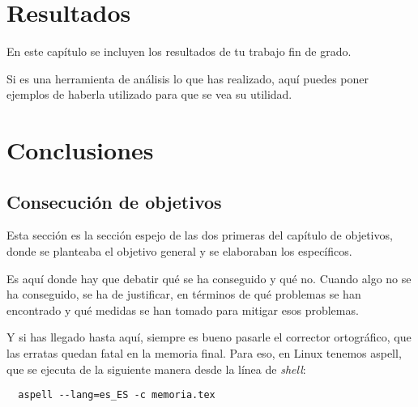 \documentclass[a4paper, 12pt]{book}
\begin{document}

\cleardoublepage
\chapter{Resultados}
\label{chap:resultados}

En este capítulo se incluyen los resultados de tu trabajo fin de grado.

Si es una herramienta de análisis lo que has realizado, aquí puedes poner ejemplos de haberla utilizado para que se vea su utilidad.



\cleardoublepage
\chapter{Conclusiones}
\label{chap:conclusiones}


\section{Consecución de objetivos}
\label{sec:consecucion-objetivos}

Esta sección es la sección espejo de las dos primeras del capítulo de objetivos, donde se planteaba el objetivo general y se elaboraban los específicos.

Es aquí donde hay que debatir qué se ha conseguido y qué no. 
Cuando algo no se ha conseguido, se ha de justificar, en términos de qué problemas se han encontrado y qué medidas se han tomado para mitigar esos problemas.

Y si has llegado hasta aquí, siempre es bueno pasarle el corrector ortográfico, que las erratas quedan fatal en la memoria final.
Para eso, en Linux tenemos aspell, que se ejecuta de la siguiente manera desde la línea de \emph{shell}:

\begin{verbatim}
  aspell --lang=es_ES -c memoria.tex
\end{verbatim}
\end{document}
